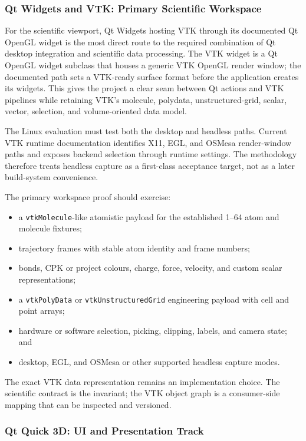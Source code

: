 \documentclass[11pt,a4paper]{article}
\begin{document}
\subsubsection{Qt Widgets and VTK: Primary Scientific Workspace}

For the scientific viewport, Qt Widgets hosting VTK through its documented Qt
OpenGL widget is the most direct route to the required combination of Qt
desktop integration and scientific data processing.  The VTK widget is a Qt
OpenGL widget subclass that houses a generic VTK OpenGL render window; the
documented path sets a VTK-ready surface format before the application creates
its widgets.  This gives the
project a clear seam between Qt actions and VTK pipelines while retaining
VTK's molecule, polydata, unstructured-grid, scalar, vector, selection, and
volume-oriented data model.

The Linux evaluation must test both the desktop and headless paths.  Current
VTK runtime documentation identifies X11, EGL, and OSMesa render-window paths
and exposes backend selection through runtime settings.  The methodology
therefore treats headless capture as a first-class acceptance target, not as a
later build-system convenience.

The primary workspace proof should exercise:

\begin{itemize}
  \item a \texttt{vtkMolecule}-like atomistic payload for the established
        1--64 atom and molecule fixtures;
  \item trajectory frames with stable atom identity and frame numbers;
  \item bonds, CPK or project colours, charge, force, velocity, and custom
        scalar representations;
  \item a \texttt{vtkPolyData} or \texttt{vtkUnstructuredGrid} engineering
        payload with cell and point arrays;
  \item hardware or software selection, picking, clipping, labels, and
        camera state; and
  \item desktop, EGL, and OSMesa or other supported headless capture modes.
\end{itemize}

The exact VTK data representation remains an implementation choice.  The
scientific contract is the invariant; the VTK object graph is a consumer-side
mapping that can be inspected and versioned.

\subsubsection{Qt Quick 3D: UI and Presentation Track}
\end{document}
